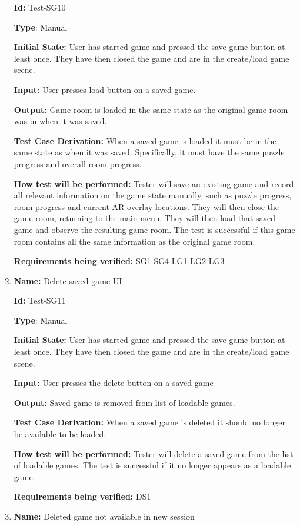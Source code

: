 \documentclass[12pt, titlepage]{article}
\begin{document}
\begin{enumerate}
\textbf{Id:} Test-SG10

\textbf{Type}: Manual

\textbf{Initial State:} User has started game and pressed the save game button at least once. They have then closed the game and are in the create/load game scene. 

\textbf{Input:} User presses load button on a saved game.

\textbf{Output:} Game room is loaded in the same state as the original game room was in when it was saved.

\textbf{Test Case Derivation:}
When a saved game is loaded it must be in the same state as when it was saved. Specifically, it must have the same puzzle progress and overall room progress.

\textbf{How test will be performed:}
Tester will save an existing game and record all relevant information on the game state manually, such as puzzle progress, room progress and current AR overlay locations. They will then close the game room, returning to the main menu. They will then load that saved game and observe the resulting game room. The test is successful if this game room contains all the same information as the original game room.

\textbf{Requirements being verified: } SG1 SG4 LG1 LG2 LG3

\item{\textbf{Name:} Delete saved game UI}

\textbf{Id:} Test-SG11

\textbf{Type}: Manual

\textbf{Initial State:} User has started game and pressed the save game button at least once. They have then closed the game and are in the create/load game scene. 

\textbf{Input:} User presses the delete button on a saved game

\textbf{Output:} Saved game is removed from list of loadable games.

\textbf{Test Case Derivation:}
When a saved game is deleted it should no longer be available to be loaded.

\textbf{How test will be performed:}
Tester will delete a saved game from the list of loadable games. The test is successful if it no longer appears as a loadable game.

\textbf{Requirements being verified: } DS1

\item{\textbf{Name:} Deleted game not available in new session}


\end{enumerate}
\end{document}
